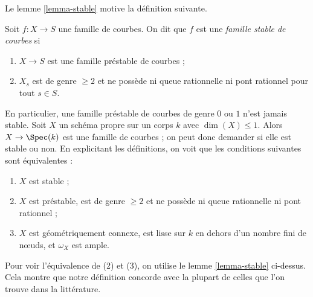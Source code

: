 \noindent
Le lemme \ref{lemma-stable} motive la définition suivante.

\begin{definition}
\label{definition-stable}
Soit $f : X \to S$ une famille de courbes.
On dit que $f$ est une {\it famille stable de courbes} si
\begin{enumerate}
\item $X \to S$ est une famille préstable de courbes ;
\item $X_s$ est de genre $\geq 2$ et ne possède ni queue rationnelle
ni pont rationnel pour tout $s \in S$.
\end{enumerate}
\end{definition}

\noindent
En particulier, une famille préstable de courbes de genre $0$ ou $1$ n'est jamais
stable.
Soit $X$ un schéma propre sur un corps $k$ avec $\dim(X) \leq 1$.
Alors $X \to \Spec(k)$ est une famille de courbes ; on peut donc demander
si elle est stable ou non. En explicitant les définitions, on voit que
les conditions suivantes sont équivalentes :
\begin{enumerate}
\item $X$ est stable ;
\item $X$ est préstable, est de genre $\geq 2$ et ne possède ni queue rationnelle
ni pont rationnel ;
\item $X$ est géométriquement connexe, est lisse sur $k$
en dehors d'un nombre fini de nœuds, et $\omega_X$ est ample.
\end{enumerate}
Pour voir l'équivalence de (2) et (3), on utilise
le lemme \ref{lemma-stable} ci-dessus.
Cela montre que notre définition concorde avec la plupart de celles que l'on trouve
dans la littérature.

